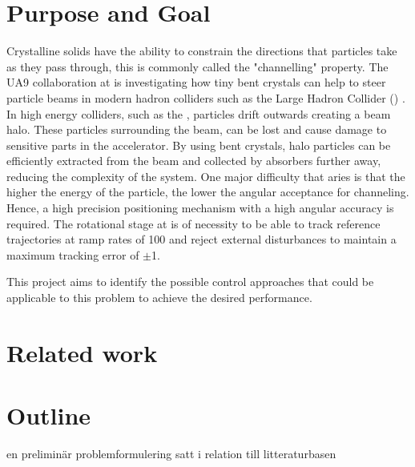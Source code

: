 \section{Purpose and Goal}
Crystalline solids have the ability to constrain the directions that particles take as they pass through, this is commonly called the "channelling" property. The UA9 collaboration at \abbrCERN is investigating how tiny bent crystals can help to steer particle beams in modern hadron colliders such as the Large Hadron Collider (\abbrLHC) \citep{WebsiteUA9:2016}. In high energy colliders, such as the \abbrLHC, particles drift outwards creating a beam halo. These particles surrounding the beam, can be lost and cause damage to sensitive parts in the accelerator. By using bent crystals, halo particles can be efficiently extracted from the beam and collected by absorbers further away, reducing the complexity of the system. One major difficulty that aries is that the higher the energy of the particle, the lower the angular acceptance for channeling. Hence, a high precision positioning mechanism with a high angular accuracy is required. The rotational stage at \abbrCERN is of necessity to be able to track reference trajectories at ramp rates of \unit{100}{\micro\radianpersecond} and reject external disturbances to maintain a maximum tracking error of $\pm$\unit{1}{\micro\rad}.

This project aims to identify the possible control approaches that could be applicable to this problem to achieve the desired performance.

\section{Related work}

\section{Outline}

en preliminär problemformulering satt i relation till litteraturbasen
